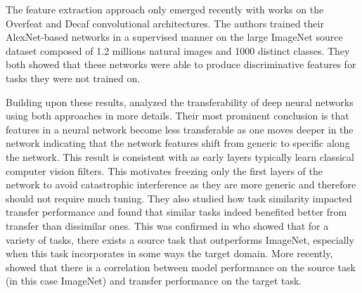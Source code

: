 The feature extraction approach only emerged recently with works on the Overfeat
\cite{sermanet2013overfeat, razavian2014cnn} and Decaf \cite{donahue2014decaf}
convolutional architectures. The authors trained their AlexNet-based networks in
a supervised manner on the large ImageNet source dataset composed of 1.2 millions
natural images and 1000 distinct classes. They both showed that these networks
were able to produce discriminative features for tasks they were not trained on.

Building upon these results, \cite{yosinski2014transferable} analyzed the
transferability of deep neural networks using both approaches in more details.
Their most prominent conclusion is that features in a neural network become less
transferable as one moves deeper in the network indicating that the network features
shift from generic to specific along the network. This result is consistent with
\cite{zeiler2014visualizing} as early layers typically learn classical computer
vision filters. This motivates freezing only the first layers of the network to
avoid catastrophic interference as they are more generic and therefore should not
require much tuning. They also studied how task similarity impacted transfer
performance and found that similar tasks indeed benefited better from transfer
than dissimilar ones. This was confirmed in \cite{mensink2021factors} who 
showed that for a variety of tasks, there exists a source task that outperforms
ImageNet, especially when this task incorporates in some ways the target domain.
More recently, \cite{kornblith2019better} showed that there is a correlation 
between model performance on the source task (in this case  ImageNet) and transfer 
performance on the target task. 

